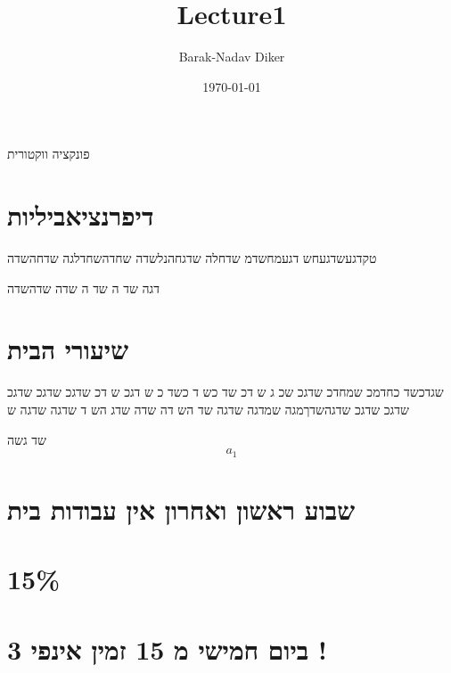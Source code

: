 \documentclass[11pt]{article}
\author{Barak-Nadav Diker}
\date{\today}
\title{Lecture1}
\begin{document}
\maketitle
פונקציה ווקטורית
\section*{דיפרנציאביליות}
\label{sec:org0fe1708}
טקדגעשדגעחש דגעמחשדמ שדחלה שדגחהנלשדה שחדהשחדלגה שדחהשדה

דגה שד
ה שד ה
שדה שדהשדה
\section*{שיעורי הבית}
\label{sec:org75815cd}
שגדכשד כחדמכ שמחדכ שדגכ שכ
ג ש
דכ שד כש
ד כשד
כ ש
דגכ ש
דכ
שדגכ שדגכ שדגכ שדגכ שדגכ שדגהשדךמגה שמדגה שדגה שד
הש
דה שדה שדג הש
ד
שדגה שדגה ש

שד גשה
\begin{equation}
a_1
\end{equation}
\section*{שבוע ראשון ואחרון אין עבודות בית}
\label{sec:orgfc9497f}
\section*{15\%}
\label{sec:org0f9243f}
\section*{ביום חמישי מ 15 זמין אינפי 3 !}
\label{sec:org8b7a2ed}
\end{document}
